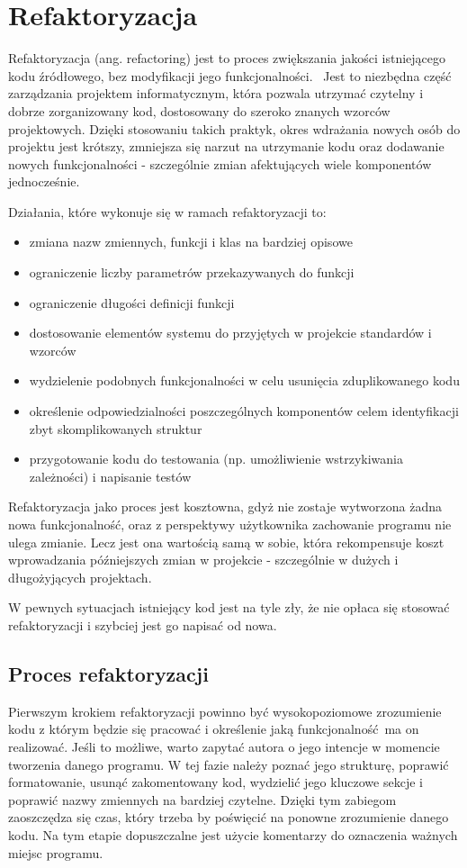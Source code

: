 \section{Refaktoryzacja}
Refaktoryzacja (ang. refactoring) jest to proces zwiększania jakości istniejącego kodu źródłowego, bez modyfikacji jego funkcjonalności.~\cite{clean-code}
Jest to niezbędna część zarządzania projektem informatycznym, która pozwala utrzymać czytelny i dobrze zorganizowany kod, dostosowany do szeroko znanych wzorców projektowych.
Dzięki stosowaniu takich praktyk, okres wdrażania nowych osób do projektu jest krótszy, zmniejsza się narzut na utrzymanie kodu oraz dodawanie nowych funkcjonalności - szczególnie zmian afektujących wiele komponentów jednocześnie. 

Działania, które wykonuje się w ramach refaktoryzacji to:
\begin{itemize}
\item zmiana nazw zmiennych, funkcji i klas na bardziej opisowe
\item ograniczenie liczby parametrów przekazywanych do funkcji
\item ograniczenie długości definicji funkcji
\item dostosowanie elementów systemu do przyjętych w projekcie standardów i wzorców
\item wydzielenie podobnych funkcjonalności w celu usunięcia zduplikowanego kodu
\item określenie odpowiedzialności poszczególnych komponentów celem identyfikacji zbyt skomplikowanych struktur
\item przygotowanie kodu do testowania (np. umożliwienie wstrzykiwania zależności) i napisanie testów
\end{itemize}

Refaktoryzacja jako proces jest kosztowna, gdyż nie zostaje wytworzona żadna nowa funkcjonalność, oraz z perspektywy użytkownika zachowanie programu nie ulega zmianie.
Lecz jest ona wartością samą w sobie, która rekompensuje koszt wprowadzania późniejszych zmian w projekcie - szczególnie w dużych i długożyjących projektach.

W pewnych sytuacjach istniejący kod jest na tyle zły, że nie opłaca się stosować refaktoryzacji i szybciej jest go napisać od nowa. 

\subsection{Proces refaktoryzacji}
Pierwszym krokiem refaktoryzacji powinno być wysokopoziomowe zrozumienie kodu z którym będzie się pracować i określenie jaką funkcjonalność ma on realizować.
Jeśli to możliwe, warto zapytać autora o jego intencje w momencie tworzenia danego programu. 
W tej fazie należy poznać jego strukturę, poprawić formatowanie, usunąć zakomentowany kod, wydzielić jego kluczowe sekcje i poprawić nazwy zmiennych na bardziej czytelne.
Dzięki tym zabiegom zaoszczędza się czas, który trzeba by poświęcić na ponowne zrozumienie danego kodu.
Na tym etapie dopuszczalne jest użycie komentarzy do oznaczenia ważnych miejsc programu. 

